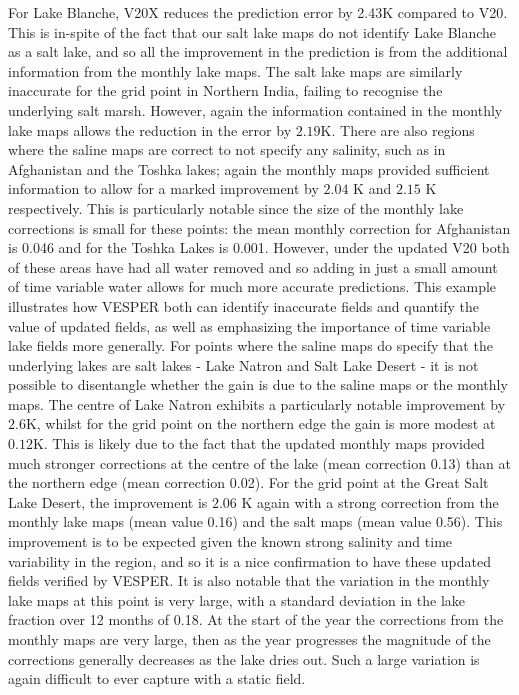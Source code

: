 \documentclass[twocolumn]{article}
\begin{document}
	For Lake Blanche, V20X reduces the prediction error by 2.43K compared to V20. This is in-spite of the fact that our salt lake maps do not identify Lake Blanche as a salt lake, and so all the improvement in the prediction is from the additional information from the monthly lake maps. The salt lake maps are similarly inaccurate for the grid point in Northern India, failing to recognise the underlying salt marsh. However, again the information contained in the monthly lake maps allows the reduction in the error by $2.19$K. There are also regions where the saline maps are correct to not specify any salinity, such as in Afghanistan and the Toshka lakes; again the monthly maps provided sufficient information to allow for a marked improvement by $2.04$ K and $2.15$ K respectively. This is particularly notable since the size of the monthly lake corrections is small for these points: the mean monthly correction for Afghanistan is 0.046 and for the Toshka Lakes is 0.001. However, under the updated V20 both of these areas have had all water removed and so adding in just a small amount of time variable water allows for much more accurate predictions. This example illustrates how VESPER both can identify inaccurate fields and quantify the value of updated fields, as well as emphasizing the importance of time variable lake fields more generally. For points where the saline maps do specify that the underlying lakes are salt lakes - Lake Natron and Salt Lake Desert - it is not possible to disentangle whether the gain is due to the saline maps or the monthly maps. The centre of Lake Natron exhibits a particularly notable improvement by $2.6$K, whilst for the grid point on the northern edge the gain is more modest at $0.12$K. This is likely due to the fact that the updated monthly maps provided much stronger corrections at the centre of the lake (mean correction 0.13) than at the northern edge (mean correction 0.02). For the grid point at the Great Salt Lake Desert, the improvement is $2.06$ K again with a strong correction from the monthly lake maps (mean value 0.16) and the salt maps (mean value 0.56). This improvement is to be expected given the known strong salinity and time variability in the region, and so it is a nice confirmation to have these updated fields verified by VESPER. It is also notable that the variation in the monthly lake maps at this point is very large, with a standard deviation in the lake fraction over 12 months of 0.18. At the start of the year the corrections from the monthly maps are very large, then as the year progresses the magnitude of the corrections generally decreases as the lake dries out. Such a large variation is again difficult to ever capture with a static field. \newline 
	
\end{document}
